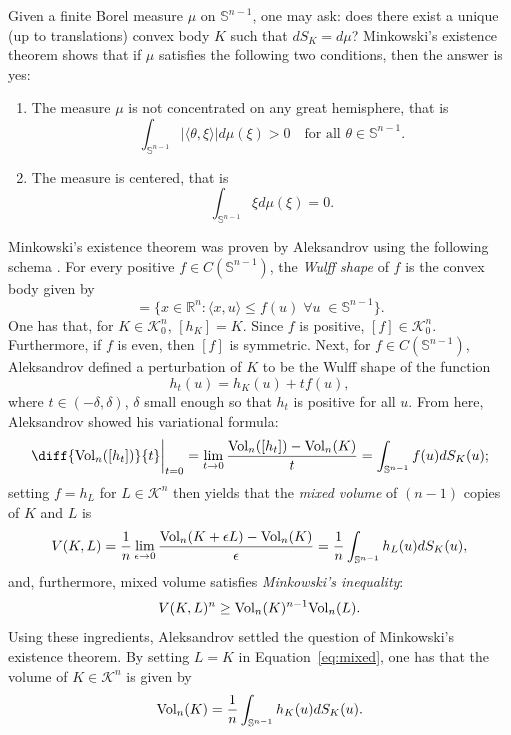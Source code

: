 \documentclass[11pt]{amsart}
\theoremstyle{definition}
\theoremstyle{remark}
\numberwithin{equation}{section}
\newcommand{\R}{\mathbb{R}}
\newcommand{\s}{\mathbb{S}}
\newcommand{\conbod}{\mathcal{K}^n}
\newcommand{\vol}{\text{\rm Vol}}
\begin{document}
Given a finite Borel measure $\mu$ on $\s^{n-1}$, one may ask: does there exist a unique (up to translations) convex body $K$ such that $dS_K=d\mu$? Minkowski's existence theorem \cite[p. 455]{Sh1} shows that if $\mu$ satisfies the following two conditions, then the answer is yes:
\begin{enumerate}
    \item The measure $\mu$ is not concentrated on any great hemisphere, that is
    \label{con_1}
    $$\int_{\s^{n-1}}|\langle \theta, \xi \rangle|d\mu(\xi) > 0 \quad \text{for all } \theta\in\s^{n-1}.$$
    \item The measure is centered, that is
    $$\int_{\s^{n-1}}\xi d\mu(\xi)=0.$$
    \label{con_2}
\end{enumerate}
Minkowski's existence theorem was proven by Aleksandrov using the following schema \cite{AL}. For every positive $f\in C(\s^{n-1})$, the \textit{Wulff shape} of $f$ is the convex body given by
	\begin{equation}
	    [f]=\{x\in\R^n:\langle x,u\rangle\leq f(u) \; \forall u \; \in \s^{n-1}\}.
	\end{equation}
	One has that, for $K\in\conbod_0$, $[h_K]=K.$ Since $f$ is positive, $[f]\in\conbod_0$. Furthermore, if $f$ is even, then $[f]$ is symmetric. Next, for $f\in C(\s^{n-1})$, Aleksandrov defined a perturbation of $K$ to be the Wulff shape of the function
	$$h_t(u)=h_K(u)+tf(u),$$
	where $t\in (-\delta,\delta)$, $\delta$ small enough so that $h_t$ is positive for all $u$. From here, Aleksandrov showed his variational formula:
	$$\diff{\vol_n([h_{t}])}{t}\bigg|_{t=0}=\lim_{t\to 0}\frac{\vol_n([h_t])-\vol_n(K)}{t}=\int_{\s^{n-1}}f(u)dS_K(u);$$
	setting $f=h_L$ for $L\in\conbod$ then yields that the \textit{mixed volume} of $(n-1)$ copies of $K$ and $L$ \cite{gardner_book} is 
	\begin{equation}
	    V(K,L)=\frac{1}{n}\lim_{\epsilon\to0}\frac{\vol_n(K+\epsilon L)-\vol_n(K)}{\epsilon}=\frac{1}{n}\int_{\s^{n-1}}h_L(u)dS_K(u),
	    \label{eq:mixed}
	\end{equation}
	and, furthermore, mixed volume satisfies \textit{Minkowski's inequality}:
	\begin{equation}
	V(K,L)^n\geq \vol_n(K)^{n-1}\vol_n(L).
	\label{eq:min_ineq}
	\end{equation}
Using these ingredients, Aleksandrov settled the question of Minkowski's existence theorem. By setting $L=K$ in Equation~\ref{eq:mixed}, one has that the volume of $K\in\conbod$ is given by $$\vol_n(K)=\frac{1}{n}\int_{\s^{n-1}}h_K(u)dS_K(u).$$
\end{document}
